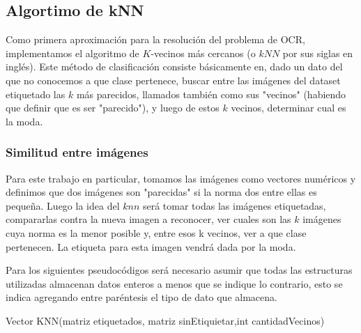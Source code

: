 \subsection{Algortimo de kNN}
Como primera aproximación para la resolución del problema de OCR, implementamos el algoritmo de $K$-vecinos más cercanos (o $kNN$ por sus siglas en inglés). Este método de clasificación consiste básicamente en, dado un dato del que no conocemos a que clase pertenece, buscar entre las imágenes del dataset etiquetado las $k$ más parecidos, llamados también como sus "vecinos" (habiendo que definir que es ser "parecido"), y luego de estos $k$ vecinos, determinar cual es la moda. 
\\
\subsubsection{Similitud entre imágenes}
Para este trabajo en particular, tomamos las imágenes como vectores numéricos y definimos que dos imágenes son "parecidas" si la norma dos entre ellas es pequeña. Luego la idea del $knn$ será tomar todas las imágenes etiquetadas, compararlas contra la nueva imagen a reconocer, ver cuales son las $k$ imágenes cuya norma es la menor posible y, entre esos k vecinos, ver a que clase pertenecen. La etiqueta para esta imagen vendrá dada por la moda. 

Para los siguientes pseudocódigos será necesario asumir que todas las estructuras utilizadas almacenan datos enteros a menos que se indique lo contrario, esto se indica agregando entre paréntesis el tipo de dato que almacena.
\\
\begin{algorithm}
\begin{algorithmic}[1]\parskip=1mm
\caption{Vector KNN(matriz etiquetados, matriz sinEtiquietar,int cantidadVecinos)}
\ENDFOR
{}
\end{algorithmic}
\end{algorithm}

